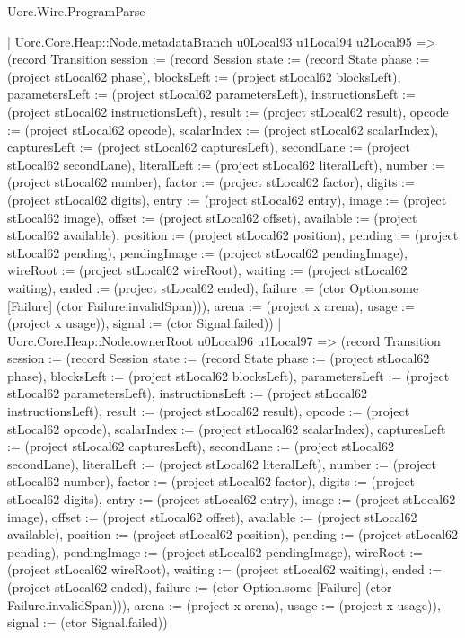 \begin{lexlean}{Uorc.Wire.ProgramParse}
\begin{semanticmodule}
{        | Uorc.Core.Heap::Node.metadataBranch u0Local93 u1Local94 u2Local95 => (record Transition {session := (record Session {state := (record State {phase := (project stLocal62 phase), blocksLeft := (project stLocal62 blocksLeft), parametersLeft := (project stLocal62 parametersLeft), instructionsLeft := (project stLocal62 instructionsLeft), result := (project stLocal62 result), opcode := (project stLocal62 opcode), scalarIndex := (project stLocal62 scalarIndex), capturesLeft := (project stLocal62 capturesLeft), secondLane := (project stLocal62 secondLane), literalLeft := (project stLocal62 literalLeft), number := (project stLocal62 number), factor := (project stLocal62 factor), digits := (project stLocal62 digits), entry := (project stLocal62 entry), image := (project stLocal62 image), offset := (project stLocal62 offset), available := (project stLocal62 available), position := (project stLocal62 position), pending := (project stLocal62 pending), pendingImage := (project stLocal62 pendingImage), wireRoot := (project stLocal62 wireRoot), waiting := (project stLocal62 waiting), ended := (project stLocal62 ended), failure := (ctor Option.some [Failure] (ctor Failure.invalidSpan))}), arena := (project x arena), usage := (project x usage)}), signal := (ctor Signal.failed)})
        | Uorc.Core.Heap::Node.ownerRoot u0Local96 u1Local97 => (record Transition {session := (record Session {state := (record State {phase := (project stLocal62 phase), blocksLeft := (project stLocal62 blocksLeft), parametersLeft := (project stLocal62 parametersLeft), instructionsLeft := (project stLocal62 instructionsLeft), result := (project stLocal62 result), opcode := (project stLocal62 opcode), scalarIndex := (project stLocal62 scalarIndex), capturesLeft := (project stLocal62 capturesLeft), secondLane := (project stLocal62 secondLane), literalLeft := (project stLocal62 literalLeft), number := (project stLocal62 number), factor := (project stLocal62 factor), digits := (project stLocal62 digits), entry := (project stLocal62 entry), image := (project stLocal62 image), offset := (project stLocal62 offset), available := (project stLocal62 available), position := (project stLocal62 position), pending := (project stLocal62 pending), pendingImage := (project stLocal62 pendingImage), wireRoot := (project stLocal62 wireRoot), waiting := (project stLocal62 waiting), ended := (project stLocal62 ended), failure := (ctor Option.some [Failure] (ctor Failure.invalidSpan))}), arena := (project x arena), usage := (project x usage)}), signal := (ctor Signal.failed)})
}
\end{semanticmodule}
\end{lexlean}
